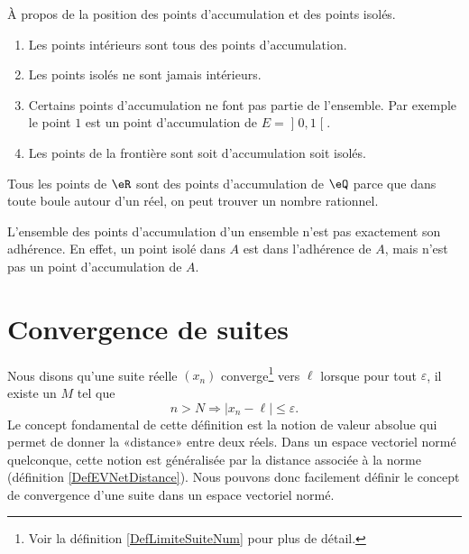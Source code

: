 \begin{remark}
    À propos de la position des points d'accumulation et des points isolés.
    \begin{enumerate}
        \item
            Les points intérieurs sont tous des points d'accumulation.
        \item
            Les points isolés ne sont jamais intérieurs.
        \item
            Certains points d'accumulation ne font pas partie de l'ensemble. Par exemple le point $1$ est un point d'accumulation de $E=\mathopen] 0 , 1 \mathclose[$.
        \item
            Les points de la frontière sont soit d'accumulation soit isolés.
    \end{enumerate}
\end{remark}


\begin{example}
	Tous les points de $\eR$ sont des points d'accumulation de $\eQ$ parce que dans toute boule autour d'un réel, on peut trouver un nombre rationnel.
\end{example}

\begin{remark}
	L'ensemble des points d'accumulation d'un ensemble n'est pas exactement son adhérence. En effet, un point isolé dans $A$ est dans l'adhérence de $A$, mais n'est pas un point d'accumulation de $A$.
\end{remark}

\section{Convergence de suites}\label{Sect_suites}

Nous disons qu'une suite réelle $(x_n)$ converge\footnote{Voir la définition \ref{DefLimiteSuiteNum} pour plus de détail.} vers $\ell$ lorsque pour tout $\varepsilon$, il existe un $M$ tel que
\begin{equation}
	n>N\Rightarrow | x_n-\ell |\leq\varepsilon.
\end{equation}
Le concept fondamental de cette définition est la notion de valeur absolue qui permet de donner la «distance» entre deux réels. Dans un espace vectoriel normé quelconque, cette notion est généralisée par la distance associée à la norme (définition \ref{DefEVNetDistance}). Nous pouvons donc facilement définir le concept de convergence d'une suite dans un espace vectoriel normé.

